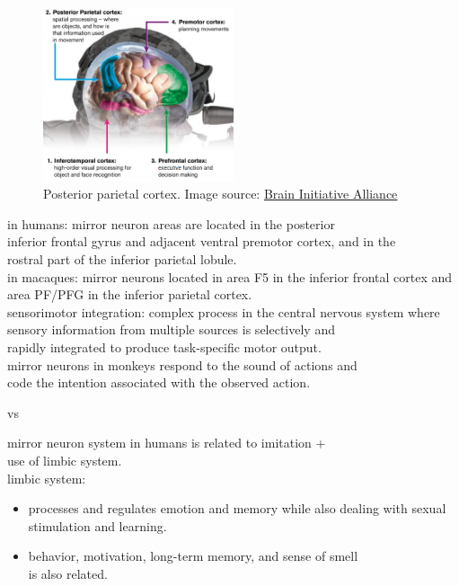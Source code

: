 \documentclass[12pt]{article}
\begin{document}
\begin{figure}[h]
    \centering
    \includegraphics[width=0.5\textwidth]{brain2.png} %
    \caption{Posterior parietal cortex. Image source: \href{https://www.braininitiative.org/wp-content/uploads/2017/08/Posterior-Parietal-Cortex-170726.jpg}{Brain Initiative Alliance}}
    \label{fig:post}
\end{figure}

\noindent in humans: mirror neuron areas are located in the posterior\\inferior frontal gyrus and adjacent ventral premotor cortex, and in the\\rostral part of the inferior parietal lobule.\\

\noindent in macaques: mirror neurons located in area F5 in the inferior frontal cortex and area PF/PFG in the inferior parietal cortex.\\

\noindent sensorimotor integration: complex process in the central nervous system where sensory information from multiple sources is selectively and\\rapidly integrated to produce task-specific motor output.\\

\noindent mirror neurons in monkeys respond to the sound of actions and\\code the intention associated with the observed action.

vs

\noindent mirror neuron system in humans is related to imitation +\\use of limbic system.\\

limbic system:

\begin{itemize}
    \item processes and regulates emotion and memory while also dealing with sexual stimulation and learning.
    \item behavior, motivation, long-term memory, and sense of smell\\is also related.
\end{itemize}
\end{document}
